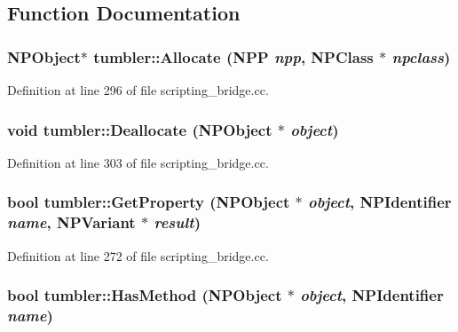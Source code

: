 \subsection{Function Documentation}
\hypertarget{namespacetumbler_a133c46b3658a35f597bf5806a58c433e}{
\subsubsection[{Allocate}]{\setlength{\rightskip}{0pt plus 5cm}NPObject$\ast$ tumbler::Allocate (NPP {\em npp}, \/  NPClass $\ast$ {\em npclass})}}
\label{namespacetumbler_a133c46b3658a35f597bf5806a58c433e}


Definition at line 296 of file scripting\_\-bridge.cc.

\hypertarget{namespacetumbler_a6e665bba23bf978176f39f24fd07d501}{
\subsubsection[{Deallocate}]{\setlength{\rightskip}{0pt plus 5cm}void tumbler::Deallocate (NPObject $\ast$ {\em object})}}
\label{namespacetumbler_a6e665bba23bf978176f39f24fd07d501}


Definition at line 303 of file scripting\_\-bridge.cc.

\hypertarget{namespacetumbler_a41d6ba518f6ce31f8fafc12eb9dd044c}{
\subsubsection[{GetProperty}]{\setlength{\rightskip}{0pt plus 5cm}bool tumbler::GetProperty (NPObject $\ast$ {\em object}, \/  NPIdentifier {\em name}, \/  NPVariant $\ast$ {\em result})}}
\label{namespacetumbler_a41d6ba518f6ce31f8fafc12eb9dd044c}


Definition at line 272 of file scripting\_\-bridge.cc.

\hypertarget{namespacetumbler_a0440bebe4c3872dbed8390142035d1d1}{
\subsubsection[{HasMethod}]{\setlength{\rightskip}{0pt plus 5cm}bool tumbler::HasMethod (NPObject $\ast$ {\em object}, \/  NPIdentifier {\em name})}}
\label{namespacetumbler_a0440bebe4c3872dbed8390142035d1d1}


